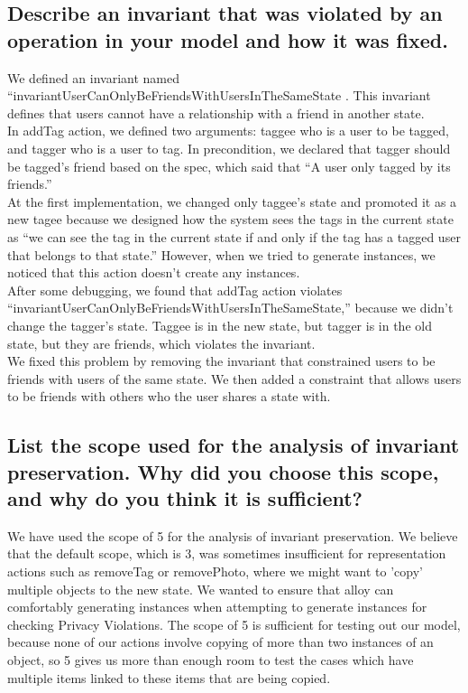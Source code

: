 \documentclass[titlepage]{article}
\begin{document}
\subsection{Describe an invariant that was violated by an operation in your model and how it was fixed.}
We defined an invariant named “invariantUserCanOnlyBeFriendsWithUsersInTheSameState
. This invariant defines that users cannot have a relationship with a friend in another state.\\

In addTag action, we defined two arguments: taggee who is a user to be tagged, and tagger who is a user to tag. In precondition, we declared that tagger should be tagged’s friend based on the spec, which said that “A user only tagged by its friends.”\\

At the first implementation, we changed only taggee’s state and promoted it as a new tagee because we designed how the system sees the tags in the current state as  “we can see the tag in the current state if and only if the tag has a tagged user that belongs to that state.” However, when we tried to generate instances, we noticed that this action doesn’t create any instances.\\

After some debugging, we found that addTag action violates “invariantUserCanOnlyBeFriendsWithUsersInTheSameState,” because we didn’t change the tagger’s state. Taggee is in the new state, but tagger is in the old state, but they are friends, which violates the invariant.\\

We fixed this problem by removing the invariant that constrained users to be friends with users of the same state. We then added a constraint that allows users to be friends with others who the user shares a state with.\\
\subsection{List the scope used for the analysis of invariant preservation. Why did you choose this scope, and why do you think it is sufficient?}

We have used the scope of 5 for the analysis of invariant preservation. We believe that the default scope, which is 3, was sometimes insufficient for representation actions such as removeTag or removePhoto, where we might want to 'copy' multiple objects to the new state. We wanted to ensure that alloy can comfortably generating instances when attempting to generate instances for checking Privacy Violations. The scope of 5 is sufficient for testing out our model, because none of our actions involve copying of more than two instances of an object, so 5 gives us more than enough room to test the cases which have multiple items linked to these items that are being copied.
\end{document}
